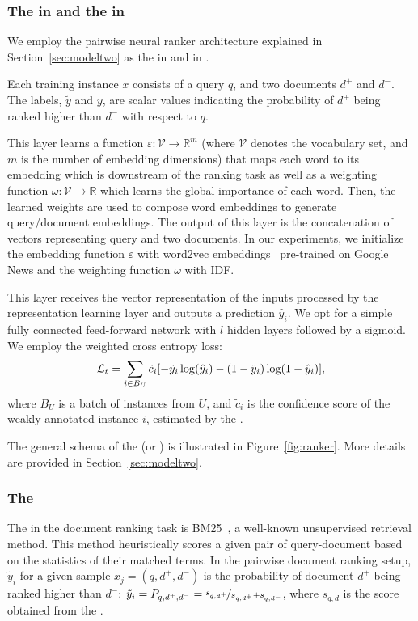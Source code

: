 \subsubsection{The \tnet in \cws and the \std in \fwl}
We employ the pairwise neural ranker architecture explained in Section~\ref{sec:modeltwo} as the \tnet in \cws and \std in \fwl. 

Each training instance $x$ consists of a query $q$, and two documents $d^+$ and $d^-$. The labels, $\tilde{y}$ and $y$, are scalar values indicating the probability of $d^+$ being ranked higher than $d^-$ with respect to $q$.

This layer learns a function $\varepsilon: \mathcal{V} \rightarrow \mathbb{R}^{m}$  (where $\mathcal{V}$ denotes the vocabulary set, and $m$ is the number of embedding dimensions) that maps each word to its embedding which is downstream of the ranking task as well as a weighting function $\omega: \mathcal{V} \rightarrow \mathbb{R}$ which learns the global importance of each word. Then, the learned weights are used to compose word embeddings to generate query/document embeddings. The output of this layer is the concatenation of vectors representing query and two documents.
%
In our experiments, we initialize the embedding function $\varepsilon$ with word2vec embeddings~\cite{Mikolov:2013} pre-trained on Google News and the weighting function $\omega$ with IDF.

This layer receives the vector representation of the inputs processed by the representation learning layer and outputs a prediction $\hat{y}_i$.
We opt for a simple fully connected feed-forward network with $l$ hidden layers followed by a sigmoid. We employ the weighted cross entropy loss:
\begin{equation}
\small
\mathcal{L}_t = \sum_{i\in B_U} \tilde{c}_i [- \tilde{y}_i \log (\hat{y}_i) - (1-\tilde{y}_i) \log(1-\hat{y}_i)],
\end{equation}
where $B_U$ is a batch of instances from $U$, and $\tilde{c}_i$ is the confidence score of the weakly annotated instance $i$, estimated by the \cnet.

The general schema of the \tnet (or \std) is illustrated in Figure~\ref{fig:ranker}. More details are provided in Section~\ref{sec:modeltwo}.

\subsubsection{The \wa}
The \wa in the document ranking task is BM25~\citep{Robertson:2009}, a well-known unsupervised retrieval method. This method heuristically scores a given pair of query-document based on the statistics of their matched terms. In the pairwise document ranking setup, $\tilde{y}_i$ for a given sample $x_j = (q,d^+,d^-)$ is the probability of document $d^+$ being ranked higher than $d^-$: 
$\tilde{y}_i = P_{q,d^+,d^-} = \nicefrac{s_{q,d^+}}{s_{q,d^+} + s_{q,d^-}}$,  where $s_{q,d}$ is the score obtained from the \wa.


